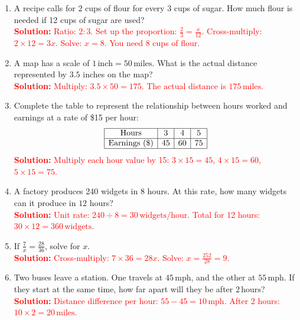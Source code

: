 \documentclass[12pt]{article}
\begin{document}
\begin{tcolorbox}[colframe=black!60, colback=white, 
coltitle=black, colbacktitle=black!15, fonttitle=\bfseries\Large, 
title=Problems, halign title=center, left=10pt, right=10pt, top=10pt, bottom=60pt]
\begin{enumerate}[start=9, itemsep=2em]
    \item A recipe calls for \( 2 \) cups of flour for every \( 3 \) cups of sugar. How much flour is needed if 12 cups of sugar are used?\\
    \textcolor{red}{\textbf{Solution:} Ratio: \( 2:3 \). Set up the proportion: \( \frac{2}{3} = \frac{x}{12} \). Cross-multiply: \( 2 \times 12 = 3x \). Solve: \( x = 8 \). You need 8 cups of flour.}

    \item A map has a scale of \( 1 \, \text{inch} = 50 \, \text{miles} \). What is the actual distance represented by \( 3.5 \) inches on the map?\\
    \textcolor{red}{\textbf{Solution:} Multiply: \( 3.5 \times 50 = 175 \). The actual distance is \( 175 \, \text{miles} \).}

    \item Complete the table to represent the relationship between hours worked and earnings at a rate of \$15 per hour:
    \[
    \begin{array}{|c|c|c|c|}
    \hline
    \text{Hours} & 3 & 4 & 5 \\
    \hline
    \text{Earnings (\$)} & 45 & 60 & 75 \\
    \hline
    \end{array}
    \]
    \textcolor{red}{\textbf{Solution:} Multiply each hour value by 15: \( 3 \times 15 = 45 \), \( 4 \times 15 = 60 \), \( 5 \times 15 = 75 \).}

    \item A factory produces 240 widgets in \( 8 \) hours. At this rate, how many widgets can it produce in \( 12 \) hours?\\
    \textcolor{red}{\textbf{Solution:} Unit rate: \( 240 \div 8 = 30 \, \text{widgets/hour} \). Total for 12 hours: \( 30 \times 12 = 360 \, \text{widgets} \).}

    \item If \( \frac{7}{x} = \frac{28}{36} \), solve for \( x \).\\
    \textcolor{red}{\textbf{Solution:} Cross-multiply: \( 7 \times 36 = 28x \). Solve: \( x = \frac{252}{28} = 9 \).}

    \item Two buses leave a station. One travels at \( 45 \, \text{mph} \), and the other at \( 55 \, \text{mph} \). If they start at the same time, how far apart will they be after \( 2 \, \text{hours} \)?\\
    \textcolor{red}{\textbf{Solution:} Distance difference per hour: \( 55 - 45 = 10 \, \text{mph} \). After 2 hours: \( 10 \times 2 = 20 \, \text{miles} \).}
\end{enumerate}
\end{tcolorbox}
\end{document}
